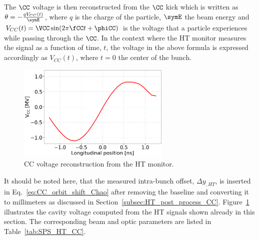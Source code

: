 The $\CC$ voltage is then reconstructed from the $\CC$ kick which is written as $\theta = - \frac{q V_{CC}(t)}{\symE}$, where $q$ is the charge of the particle, $\symE$ the beam energy and $V_{CC}(t) = \VCC \sin(2 \pi \fCC t + \phiCC) $ is the voltage that a particle experiences while passing through the $\CC$. In the context where the HT monitor measures the signal as a function of time, $t$, the voltage in the above formula is expressed accordingly as $V_{CC}(t)$, where $t=0$ the center of the bunch.

\begin{figure}[!h]
\centering         
\includegraphics[width=0.65\textwidth]{images/Ch4/HT_VCC_callibration_20180530_135105_CC_post_processing.png}
    \caption{CC voltage reconstruction from the HT monitor.}
    \label{fig:VCC_from_HT_monitor_measurement}
\end{figure}

It should be noted here, that the measured intra-bunch offset, $\Delta y_{, HT}$, is inserted in Eq.~\eqref{eq:CC_orbit_shift_Chao} after removing the baseline and converting it to millimeters as discussed in Section~\ref{subsec:HT_post_process_CC}. Figure~\ref{fig:VCC_from_HT_monitor_measurement} illustrates the cavity voltage computed from the HT signals shown already in this section. The corresponding beam and optic parameters are listed in Table~\ref{tab:SPS_HT_CC}.

